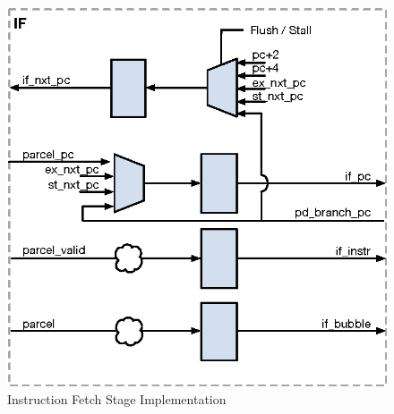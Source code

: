 \begin{figure}[h]
  \includegraphics{assets/img/Pipeline-IF}
  \caption{Instruction Fetch Stage Implementation}
\end{figure}


